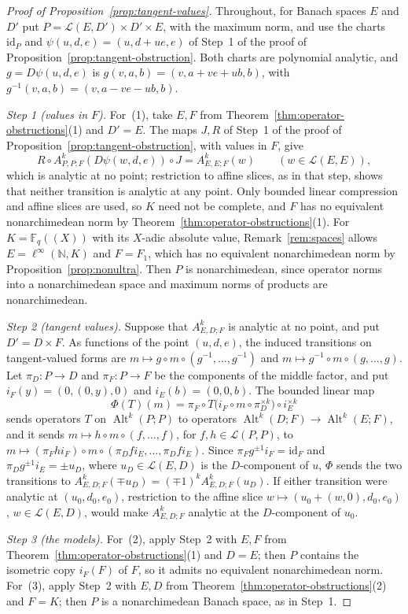 \documentclass[11pt]{amsart}
\theoremstyle{definition}
\theoremstyle{remark}
\numberwithin{equation}{section}
\newcommand{\N}{\mathbb N}
\newcommand{\F}{\mathbb F}
\newcommand{\cL}{\mathcal L}
\newcommand{\Alt}{\operatorname{Alt}}
\newcommand{\linf}{\ell^\infty}
\newcommand{\id}{\mathrm{id}}
\theoremstyle{plain}
\theoremstyle{definition}
\theoremstyle{plain}
\begin{document}
\begin{proof}[Proof of Proposition~\ref{prop:tangent-values}]
Throughout, for Banach spaces $E$ and $D'$ put $P=\cL(E,D')\times D'\times E$, with the maximum norm, and use the charts $\id_P$ and $\psi(u,d,e)=(u,d+ue,e)$ of Step~1 of the proof of Proposition~\ref{prop:tangent-obstruction}. Both charts are polynomial analytic, and $g=D\psi(u,d,e)$ is $g(v,a,b)=(v,a+ve+ub,b)$, with $g^{-1}(v,a,b)=(v,a-ve-ub,b)$.

\emph{Step 1 (values in $F$).} For~(1), take $E,F$ from Theorem~\ref{thm:operator-obstructions}(1) and $D'=E$. The maps $J,R$ of Step~1 of the proof of Proposition~\ref{prop:tangent-obstruction}, with values in $F$, give
\[
 R\circ A^k_{P,P;F}(D\psi(w,d,e))\circ J=A^k_{E,E;F}(w)\qquad(w\in\cL(E,E)),
\]
which is analytic at no point; restriction to affine slices, as in that step, shows that neither transition is analytic at any point. Only bounded linear compression and affine slices are used, so $K$ need not be complete, and $F$ has no equivalent nonarchimedean norm by Theorem~\ref{thm:operator-obstructions}(1). For $K=\F_q((X))$ with its $X$\nobreakdash-adic absolute value, Remark~\ref{rem:spaces} allows $E=\linf(\N,K)$ and $F=F_1$, which has no equivalent nonarchimedean norm by Proposition~\ref{prop:nonultra}. Then $P$ is nonarchimedean, since operator norms into a nonarchimedean space and maximum norms of products are nonarchimedean.

\emph{Step 2 (tangent values).} Suppose that $A^k_{E,D;F}$ is analytic at no point, and put $D'=D\times F$. As functions of the point $(u,d,e)$, the induced transitions on tangent-valued forms are $m\mapsto g\circ m\circ(g^{-1},\ldots,g^{-1})$ and $m\mapsto g^{-1}\circ m\circ(g,\ldots,g)$. Let $\pi_D\colon P\to D$ and $\pi_F\colon P\to F$ be the components of the middle factor, and put $i_F(y)=(0,(0,y),0)$ and $i_E(b)=(0,0,b)$. The bounded linear map
\[
 \Phi(T)(m)=\pi_F\circ T\bigl(i_F\circ m\circ\pi_D^{\times k}\bigr)\circ i_E^{\times k}
\]
sends operators $T$ on $\Alt^k(P;P)$ to operators $\Alt^k(D;F)\to\Alt^k(E;F)$, and it sends $m\mapsto h\circ m\circ(f,\ldots,f)$, for $f,h\in\cL(P,P)$, to $m\mapsto(\pi_Fhi_F)\circ m\circ(\pi_Dfi_E,\ldots,\pi_Dfi_E)$. Since $\pi_Fg^{\pm1}i_F=\id_F$ and $\pi_Dg^{\pm1}i_E=\pm u_D$, where $u_D\in\cL(E,D)$ is the $D$\nobreakdash-component of $u$, $\Phi$ sends the two transitions to $A^k_{E,D;F}(\mp u_D)=(\mp1)^kA^k_{E,D;F}(u_D)$. If either transition were analytic at $(u_0,d_0,e_0)$, restriction to the affine slice $w\mapsto(u_0+(w,0),d_0,e_0)$, $w\in\cL(E,D)$, would make $A^k_{E,D;F}$ analytic at the $D$\nobreakdash-component of $u_0$.

\emph{Step 3 (the models).} For~(2), apply Step~2 with $E,F$ from Theorem~\ref{thm:operator-obstructions}(1) and $D=E$; then $P$ contains the isometric copy $i_F(F)$ of $F$, so it admits no equivalent nonarchimedean norm. For~(3), apply Step~2 with $E,D$ from Theorem~\ref{thm:operator-obstructions}(2) and $F=K$; then $P$ is a nonarchimedean Banach space, as in Step~1.
\end{proof}
\end{document}

